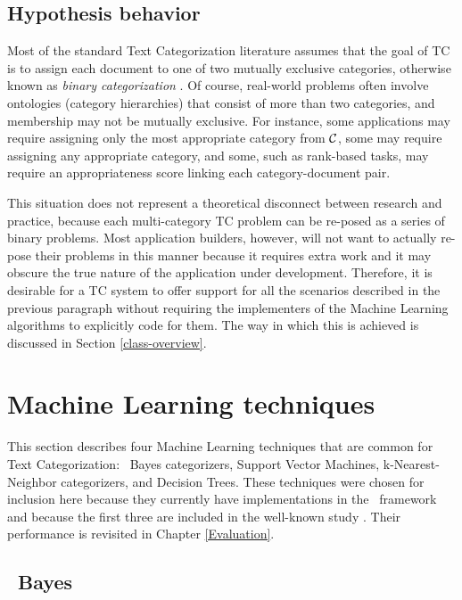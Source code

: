 \subsection{Hypothesis behavior}
\label{Hypothesis behavior}

Most of the standard Text Categorization literature assumes that the
goal of TC is to assign each document to one of two mutually exclusive
categories, otherwise known as \emph{binary
categorization} \cite[p. 3]{sebastiani:02}. Of course, real-world
problems often involve ontologies (category hierarchies) that consist of more than two
categories, and membership may not be mutually exclusive.  For
instance, some applications may require assigning only the most
appropriate category from $\mathcal{C}$, some may require assigning any
appropriate category, and some, such as rank-based tasks, may require
an appropriateness score linking each category-document pair.

This situation does not represent a theoretical disconnect between
research and practice, because each multi-category TC problem can be
re-posed as a series of binary problems.  Most application builders,
however, will not want to actually re-pose their problems in this
manner because it requires extra work and it may obscure the true
nature of the application under development.  Therefore, it is
desirable for a TC system to offer support for all the scenarios
described in the previous paragraph without requiring the
implementers of the Machine Learning algorithms to explicitly code for
them.  The way in which this is achieved is discussed in Section
\ref{class-overview}.

\section{Machine Learning techniques}
\label{machine-learning}

This section describes four Machine Learning techniques that are
common for Text Categorization: \naive\ Bayes categorizers, Support
Vector Machines, k-Nearest-Neighbor categorizers, and Decision Trees.
These techniques were chosen for inclusion here because they
currently have implementations in the \aicat\ framework and because
the first three are included in the well-known study \cite{yang:99}.  Their
performance is revisited in Chapter \ref{Evaluation}.

\subsection{\naive\ Bayes}


